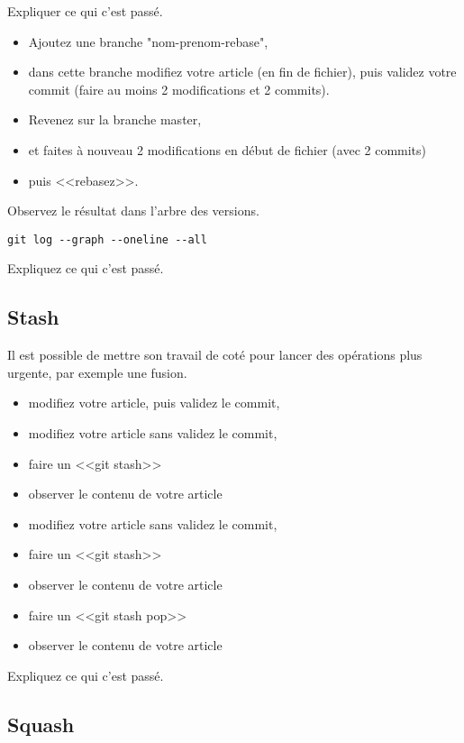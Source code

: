 \documentclass[a4paper]{article}
\begin{document}
Expliquer ce qui c'est passé.

\begin{itemize}
  \item Ajoutez une branche "nom-prenom-rebase", 
  \item dans cette branche modifiez votre article (en fin de fichier), puis validez votre commit (faire au moins 2 modifications et 2 commits). 
  \item Revenez sur la branche master, 
  \item et faites à nouveau 2 modifications en début de fichier (avec 2 commits) 
  \item puis <<rebasez>>.
\end{itemize}

Observez le résultat dans l'arbre des versions. 
\begin{verbatim}
git log --graph --oneline --all
\end{verbatim}

Expliquez ce qui c'est passé.

\subsection{Stash}

Il est possible de mettre son travail de coté pour lancer des opérations plus urgente, par exemple une fusion.

\begin{itemize}
  \item modifiez votre article, puis validez le commit,
  \item modifiez votre article sans validez le commit,
  \item faire un <<git stash>>
  \item observer le contenu de votre article
  \item modifiez votre article sans validez le commit,
  \item faire un <<git stash>>
  \item observer le contenu de votre article
  \item faire un <<git stash pop>> 
  \item observer le contenu de votre article
\end{itemize}

Expliquez ce qui c'est passé.

\subsection{Squash}
\end{document}
